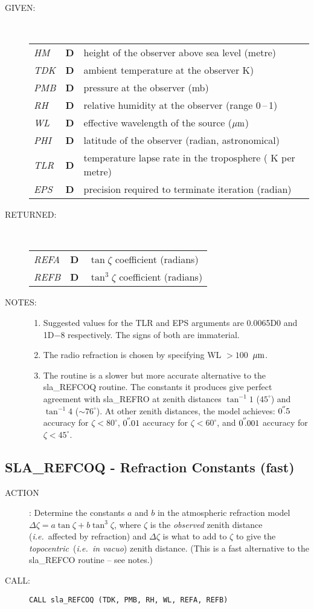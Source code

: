\documentclass[11pt,twoside]{article}
\newcommand{\xlabel}[1]{}
\newcommand{\arcsec}[2] {\arcseci{#1}$\hspace{-0.4em}.#2$}
\newcommand{\arcsec}[2] {
      {$#1\hspace{-0.05em}^{'\hspace{-0.1em}'}\hspace{-0.4em}.#2$}
   }
\newcommand{\arcseci}[1] {$#1\hspace{-0.05em}$\raisebox{-0.5ex}
                         {$^{'\hspace{-0.1em}'}$}}
\renewcommand{\arcseci}[1] {$#1\hspace{-0.05em}^{'\hspace{-0.1em}'}$}
\newcommand{\routine}[3]
{\hbadness=10000
  \vbox
  {
    \rule{\textwidth}{0.3mm}\\
    {\Large {\bf #1} \hfill #2 \hfill {\bf #1}}\\
    \setlength{\oldspacing}{\topsep}
    \setlength{\topsep}{0.3ex}
    \begin{description}
      #3
    \end{description}
    \setlength{\topsep}{\oldspacing}
  }
}
\renewcommand{\routine}[3]
   {
      \subsection{#1\xlabel{#1} - #2\label{#1}}
       \begin{description}
         #3
       \end{description}
   }
\newcommand{\action}[1]
{\item[ACTION]: #1}
\newcommand{\action}[1]
   {\item[ACTION:] #1}
\newcommand{\call}[1]
{\item[CALL]: \hspace{0.4em}{\tt #1}}
\newlength{\oldspacing}
\renewcommand{\call}[1]
   {
    \item[CALL:] {\tt #1}
   }
\newcommand{\args}[2]
{
  \goodbreak
  \setlength{\oldspacing}{\topsep}
  \setlength{\topsep}{0.3ex}
  \begin{description}
  \item[#1]:\\[1.5ex]
    \begin{tabular}{p{7em}p{6em}p{22em}}
      #2
    \end{tabular}
  \end{description}
  \setlength{\topsep}{\oldspacing}
}
\renewcommand{\args}[2]
   {
     \begin{description}
        \item[#1:]\\
        \begin{tabular}{p{7em}p{6em}l}
           #2
        \end{tabular}
     \end{description}
   }
\newcommand{\spec}[3]
{
  {\em {#1}} & {\bf \mbox{#2}} & {#3}
}
\newcommand{\notes}[1]
{
  \goodbreak
  \setlength{\oldspacing}{\topsep}
  \setlength{\topsep}{0.3ex}
  \begin{description}
    \item[NOTES]:
        #1
  \end{description}
  \setlength{\topsep}{\oldspacing}
}
\renewcommand{\notes}[1]
   {
      \begin{description}
         \item[NOTES:]
            #1
      \end{description}
   }
\begin{document}
\args{GIVEN}
{
 \spec{HM}{D}{height of the observer above sea level (metre)} \\
 \spec{TDK}{D}{ambient temperature at the observer K)} \\
 \spec{PMB}{D}{pressure at the observer (mb)} \\
 \spec{RH}{D}{relative humidity at the observer (range 0\,--\,1)} \\
 \spec{WL}{D}{effective wavelength of the source ($\mu{\rm m}$)} \\
 \spec{PHI}{D}{latitude of the observer (radian, astronomical)} \\
 \spec{TLR}{D}{temperature lapse rate in the troposphere
                                     ( K per metre)} \\
 \spec{EPS}{D}{precision required to terminate iteration (radian)}
}
\args{RETURNED}
{
 \spec{REFA}{D}{$\tan \zeta$ coefficient (radians)} \\
 \spec{REFB}{D}{$\tan^{3} \zeta$ coefficient (radians)}
}
\notes
{
 \begin{enumerate}
  \item Suggested values for the TLR and EPS arguments are 0.0065D0 and
        1D$-$8 respectively.  The signs of both are immaterial.
  \item The radio refraction is chosen by specifying WL $>100$~$\mu{\rm m}$.
  \item The routine is a slower but more accurate alternative to the
        sla\_REFCOQ routine.  The constants it produces give perfect
        agreement with sla\_REFRO at zenith distances
        $\tan^{-1} 1$ ($45^\circ$) and $\tan^{-1} 4$ ($\sim 76^\circ$).
        At other zenith distances, the model achieves:
        \arcsec{0}{5} accuracy for $\zeta<80^{\circ}$,
        \arcsec{0}{01} accuracy for $\zeta<60^{\circ}$, and
        \arcsec{0}{001} accuracy for $\zeta<45^{\circ}$.
 \end{enumerate}
}
\routine{SLA\_REFCOQ}{Refraction Constants (fast)}
{
 \action{Determine the constants $a$ and $b$ in the
         atmospheric refraction model
         $\Delta \zeta = a \tan \zeta + b \tan^{3} \zeta$,
         where $\zeta$ is the {\it observed}\/ zenith distance
         ({\it i.e.}\ affected by refraction) and $\Delta \zeta$ is
         what to add to $\zeta$ to give the {\it topocentric}\,
         ({\it i.e.\ in vacuo}) zenith distance. (This is a fast
         alternative to the sla\_REFCO routine -- see notes.)}
 \call{CALL sla\_REFCOQ (TDK, PMB, RH, WL, REFA, REFB)}
}
\end{document}
